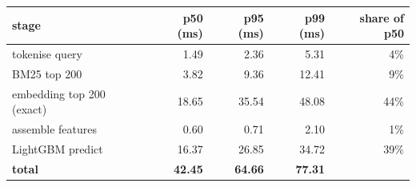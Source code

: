 \begin{tabular}{@{}lrrrr@{}}
\toprule
stage & p50 (ms) & p95 (ms) & p99 (ms) & share of p50 \\
\midrule
tokenise query & 1.49 & 2.36 & 5.31 & 4\% \\
BM25 top 200 & 3.82 & 9.36 & 12.41 & 9\% \\
embedding top 200 (exact) & 18.65 & 35.54 & 48.08 & 44\% \\
assemble features & 0.60 & 0.71 & 2.10 & 1\% \\
LightGBM predict & 16.37 & 26.85 & 34.72 & 39\% \\
\textbf{total} & \textbf{42.45} & \textbf{64.66} & \textbf{77.31} &  \\
\bottomrule
\end{tabular}
